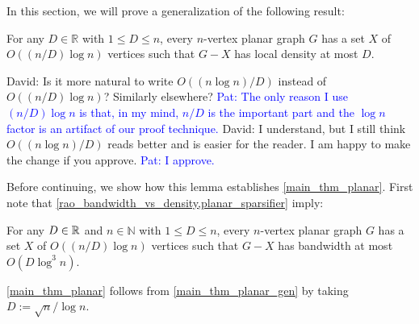 \documentclass{patmorin}
\renewcommand{\le}{\leqslant}
\renewcommand{\leq}{\leqslant}
\newcommand{\david}[1]{{\color{orange} David: #1}}
\newcommand{\pat}[1]{\textcolor{Blue}{Pat: #1}}
\newcommand{\NN}{\mathbb{N}}
\begin{document}
In this section, we will prove a generalization of the following result:

\begin{lem}\label{planar_sparsifier}
  For any $D\in\mathbb{R}$ with $1\leq D\leq n$, every $n$-vertex planar graph $G$ has a set $X$ of $O((n/D)\log n)$ vertices such that $G-X$ has local density at most $D$.
\end{lem}

\david{Is it more natural to write
$O((n\log n)/D)$ instead of $O((n/D)\log n)$? Similarly elsewhere?} \pat{The only reason I use $(n/D)\log n$ is that, in my mind, $n/D$ is the important part and the $\log n$ factor is an artifact of our proof technique.} \david{I understand, but I still think $O((n\log n)/D)$ reads better and is easier for the reader. I am happy to make  the change if you approve. } \pat{I approve.}

Before continuing, we show how this lemma establishes \cref{main_thm_planar}. First note that
\cref{rao_bandwidth_vs_density,planar_sparsifier} imply:

\begin{cor}
\label{main_thm_planar_gen}
    For any $D\in\mathbb{R}$ and $n\in\NN$ with $1\leq D\leq n$, every $n$-vertex planar graph $G$ has a set $X$ of $O((n/D)\log n)$ vertices such that $G-X$ has bandwidth at most $O(D\log^3 n)$.
\end{cor}

\cref{main_thm_planar} follows from \cref{main_thm_planar_gen}  by taking $D:=\sqrt{n}/\log n$.


%
%
%


\end{document}
